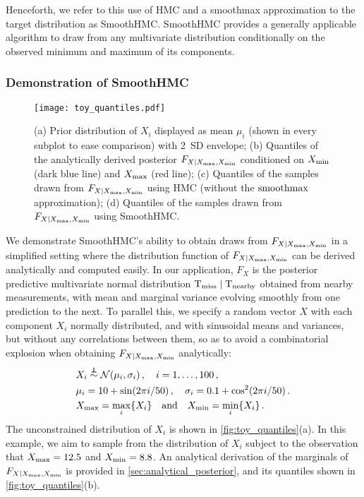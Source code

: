 Henceforth, we refer to this use of HMC and a smoothmax approximation to the target distribution as SmoothHMC.
SmoothHMC provides a generally applicable algorithm to draw from any multivariate distribution conditionally on the observed minimum and maximum of its components.

\subsubsection{Demonstration of SmoothHMC}
\label{sec:toy_example}

\begin{figure}[!tb]
\centering
\texttt{[image: toy\_quantiles.pdf]}
\caption{\label{fig:toy_quantiles}(a) Prior distribution of \(X_i\) displayed as mean \(\mu_i\) (shown in every subplot to ease comparison) with 2~SD envelope; (b) Quantiles of the analytically derived posterior \(F_{X \mid X_{\max},X_{\min}}\) conditioned on \(X_{\min}\) (dark blue line) and \(X_{\max}\) (red line); (c) Quantiles of the samples drawn from \(F_{X \mid X_{\max},X_{\min}}\) using HMC (without the \(\operatorname*{smoothmax}\) approximation); (d) Quantiles of the samples drawn from \(F_{X \mid X_{\max},X_{\min}}\) using SmoothHMC.}
\end{figure}

We demonstrate SmoothHMC's ability to obtain draws from \(F_{X \mid X_{\max},X_{\min}}\) in a simplified setting where the distribution function of \(F_{X \mid X_{\max},X_{\min}}\) can be derived analytically and computed easily.
In our application, \(F_X\) is the posterior predictive multivariate normal distribution \(\mathrm{T}_{\mathrm{miss}} \mid \mathrm{T}_{\mathrm{nearby}}\) obtained from nearby measurements, with mean and marginal variance evolving smoothly from one prediction to the next.
To parallel this, we specify a random vector \(X\) with each component \(X_i\) normally distributed, and with sinusoidal means and variances, but without any correlations between them,
so as to avoid a combinatorial explosion when obtaining \(F_{X \mid X_{\max},X_{\min}}\) analytically:
\begin{equation}
\begin{split}
& X_i \overset{\indep}{\sim} \normal \del{\mu_i, \sigma_i} \,,\quad i = 1, \dotsc, 100 \,, \\
& \mu_i = 10 + \sin\del{2\pi i / 50} \,,\quad \sigma_i = 0.1+\cos^2\del{2\pi i / 50} \,.\\
& \Xmax = \max_i\cbr{X_i} \quad\text{and}\quad \Xmin = \min_i\cbr{X_i} 
\,.
\end{split}
\label{eq:toyspec}
\end{equation}
The unconstrained distribution of \(X_i\) is shown in \autoref{fig:toy_quantiles}(a).
In this example, we aim to sample from the distribution of \(X_i\) subject to the observation that \(X_{\max}=12.5\) and \(X_{\min}=8.8\).
An analytical derivation of the marginals of \(F_{X \mid X_{\max},X_{\min}}\) is provided in \autoref{sec:analytical_posterior}, and its quantiles shown in \autoref{fig:toy_quantiles}(b).


